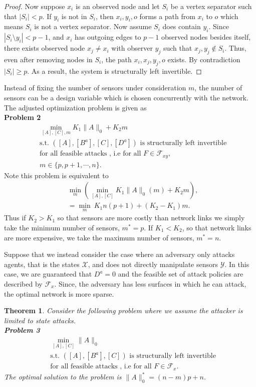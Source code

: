 \documentclass[letterpaper, 10 pt, conference]{ieeeconf}
\newtheorem{theorem}{Theorem}
\begin{document}
\begin{proof}
Now suppose $x_i$ is an observed node and let $S_i$ be a vertex separator such that $|S_i| < p$. If $y_i$ is not in $S_i$, then $x_i, y_i, o$ forms a path from $x_i$ to $o$ which means $S_i$ is not a vertex separator. Now assume $S_i$ does contain $y_i$. Since $|S_i \setminus y_i| < p-1$, and $x_i$ has outgoing edges to $p-1$ observed nodes besides itself, there exists observed node $x_j \neq x_i$ with observer $y_j$ such that $x_j, y_j \notin S_i$. Thus, even after removing nodes in $S_i$, the path $x_i, x_j, y_j, o$ exists. By contradiction $|S_i| \ge p$. As a result, the system is structurally left invertible.
\end{proof}

Instead of fixing the number of sensors under consideration $m$, the number of sensors can be a design variable which is chosen concurrently with the network. The adjusted optimization problem is given as \\
\textbf{Problem 2}
\begin{align*}
 & \underset{[A],[C], m}{\min}  K_1\| A \|_0  + K_2 m\\
 & \mbox{s.t. } ([A],[B^a],[C],[D^a]) \mbox{ is structurally left invertible} \\ 
 &\mbox{for all feasible attacks , i.e for all }F \in \mathcal{F}_{xy}, \\
 & m \in \{p, p+1, \cdots, n\}.
\end{align*}
Note this problem is equivalent to 
\begin{align*}
 & \underset{m}{\min}  \left( \underset{[A],[C]}{\min}  K_1\| A \|_0(m)  + K_2 m \right),\\
 & = \underset{m}{\min}  ~ K_1n(p+1) + (K_2-K_1)m.
\end{align*}
Thus if $K_2 > K_1$ so that sensors are more costly than network links we simply take the minimum number of sensors, $m^* = p$. If $K_1 < K_2$, so that network links are more expensive, we take the maximum number of sensors, $m^* = n$.

Suppose that we instead consider the case where an adversary only attacks agents, that is the states $\mathcal{X}$, and does not directly manipulate sensors $\mathcal{Y}$. In this case, we are guaranteed that $D^a = 0$ and the feasible set of attack policies are described by $\mathcal{F}_x$. Since, the adversary has less surfaces in which he can attack, the optimal network is more sparse.
\begin{theorem}
Consider the following problem where we assume the attacker is limited to state attacks. \\
\textbf{Problem 3}
\begin{align*}
 & \underset{[A],[C]}{\min}  \| A \|_0 \\
 & \mbox{s.t. } ([A],[B^a],[C]) \mbox{ is structurally left invertible} \\ 
 &\mbox{for all feasible attacks , i.e for all }F \in \mathcal{F}_x.
\end{align*}
The optimal solution to the problem  is $\|A\|_0^* =  (n-m)p + n$. \label{optimization2}
\end{theorem}
\end{document}
